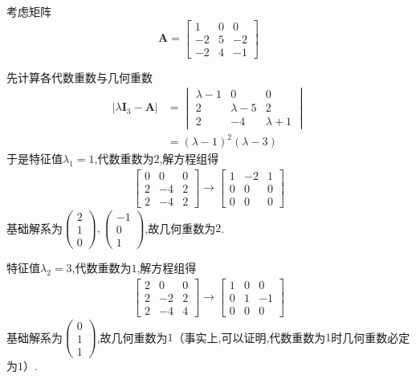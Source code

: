 \begin{brown}
\begin{example}
    考虑矩阵\newpage
    \[
    \bm{A}=\begin{bmatrix}
        1&0&0\\-2&5&-2\\-2&4&-1
    \end{bmatrix}
    \]
\end{example}
\begin{Proof}
先计算各代数重数与几何重数
\begin{align*}
    \left|
    \lambda\bm{I}_3-\bm{A}
    \right|&=\begin{vmatrix}
        \lambda-1&0&0\\2&\lambda-5&2\\2&-4&\lambda+1
    \end{vmatrix}\\
    &=\left(
        \lambda-1
    \right)^2\left(
        \lambda-3
    \right)
\end{align*}于是特征值$\lambda_1=1$,代数重数为$2$,解方程组得
\begin{align*}
    \begin{bmatrix}
        0&0&0\\2&-4&2\\2&-4&2
    \end{bmatrix}\longrightarrow
    \begin{bmatrix}
        1&-2&1\\0&0&0\\0&0&0
    \end{bmatrix}
\end{align*}基础解系为$\begin{pmatrix}
    2\\1\\0
\end{pmatrix},\begin{pmatrix}
    -1\\0\\1
\end{pmatrix}$,故几何重数为$2$.

特征值$\lambda_2=3$,代数重数为$1$,解方程组得
\begin{align*}
    \begin{bmatrix}
        2&0&0\\2&-2&2\\2&-4&4
    \end{bmatrix}\longrightarrow
    \begin{bmatrix}
        1&0&0\\0&1&-1\\0&0&0
    \end{bmatrix}
\end{align*}基础解系为$\begin{pmatrix}
    0\\1\\1
\end{pmatrix}$,故几何重数为$1$（事实上,可以证明,代数重数为$1$时几何重数必定为$1$）.


\end{Proof}
\end{brown}
